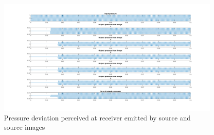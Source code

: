 \begin{figure}

    \centerline{\includegraphics[width=1.8\textwidth,keepaspectratio]{LaTeX/images/plots/matlab_4_walls_order_1.png}}
    \caption{Pressure deviation perceived at receiver emitted by source and source images}
    \label{fig:ism_4_1_mat}
\end{figure}
\newpage
